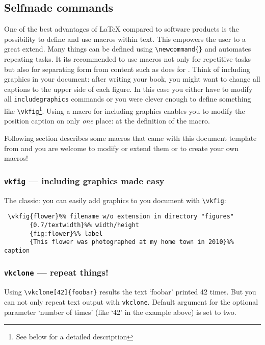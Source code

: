 \subsection{Selfmade commands}

One of the best advantages of \LaTeX{} compared to  software products is
the possibility to define and use macros within text. This empowers the user to
a great extend.  Many things can be defined using \verb#\newcommand{}# and
automates repeating tasks. It its recommended to use macros not only for
repetitive tasks but also for separating form from content such as 
does for . Think of including graphics in your document: after
writing your book, you might want to change all captions to the upper side of
each figure. In this case you either have to modify all
\texttt{includegraphics} commands or you were clever enough to define something
like \verb#\vkfig#\footnote{See below for a detailed description}. Using a
macro for including graphics enables you to modify the position caption on only
\emph{one} place: at the definition of the macro.

Following section describes some macros that came with this document template
from \vkLaT and you are welcome to modify or extend them or to create
your own macros!


\subsubsection{\texttt{vkfig} --- including graphics made easy}

The classic: you can easily add graphics to you document with \verb#\vkfig#:
\begin{verbatim}
 \vkfig{flower}%% filename w/o extension in directory "figures"
       {0.7/textwidth}%% width/height
       {fig:flower}%% label
       {This flower was photographed at my home town in 2010}%% caption
\end{verbatim}


\subsubsection{\texttt{vkclone} --- repeat things!}

Using \verb#\vkclone[42]{foobar}# results the text `foobar' printed 42 times.
But you can not only repeat text output with \texttt{vkclone}. 
Default argument
for the optional parameter `number of times' (like `42' in the example above) 
is set to two.

